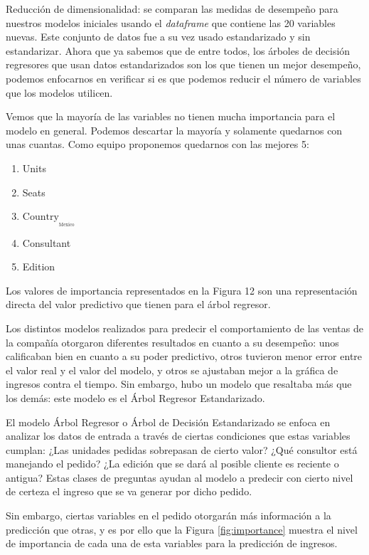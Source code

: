 \documentclass{article}
\begin{document}
        Reducción de dimensionalidad: se comparan las medidas de desempeño para nuestros modelos iniciales usando el \emph{dataframe} que contiene las 20 variables nuevas. Este conjunto de datos fue a su vez usado estandarizado y sin estandarizar. Ahora que ya sabemos que de entre todos, los árboles de decisión regresores que usan datos estandarizados son los que tienen un mejor desempeño, podemos enfocarnos en verificar si es que podemos reducir el número de variables que los modelos utilicen.
        
        Vemos que la mayoría de las variables no tienen mucha importancia para el modelo en general. Podemos descartar la mayoría y solamente quedarnos con unas cuantas. Como equipo proponemos quedarnos con las mejores 5:
        
        \begin{enumerate}
            \item Units
            \item Seats
            \item $\text{Country}__\text{Mexico}$
            \item Consultant
            \item Edition 
        \end{enumerate}
        
        Los valores de importancia representados en la Figura 12 son una representación directa del valor predictivo que tienen para el árbol regresor.
        
        Los distintos modelos realizados para predecir el comportamiento de las ventas de la compañía otorgaron diferentes resultados en cuanto a su desempeño: unos calificaban bien en cuanto a su poder predictivo, otros tuvieron menor error entre el valor real y el valor del modelo, y otros se ajustaban mejor a la gráfica de ingresos contra el tiempo. Sin embargo, hubo un modelo que resaltaba más que los demás: este modelo es el Árbol Regresor Estandarizado.
        
        El modelo Árbol Regresor o Árbol de Decisión Estandarizado se enfoca en analizar los datos de entrada a través de ciertas condiciones que estas variables cumplan: ¿Las unidades pedidas sobrepasan de cierto valor? ¿Qué consultor está manejando el pedido? ¿La edición que se dará al posible cliente es reciente o antigua? Estas clases de preguntas ayudan al modelo a predecir con cierto nivel de certeza el ingreso que se va generar por dicho pedido.
        
        Sin embargo, ciertas variables en el pedido otorgarán más información a la predicción que otras, y es por ello que la Figura \ref{fig:importance} muestra el nivel de importancia de cada una de esta variables para la predicción de ingresos.
        
\end{document}
